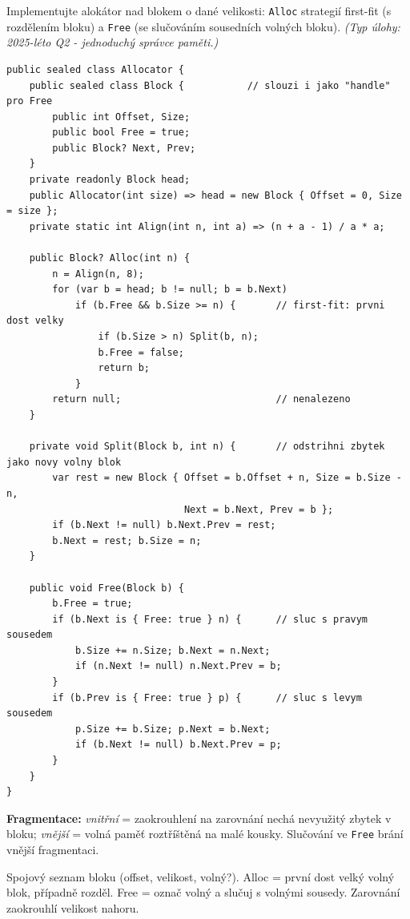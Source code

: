 \begin{zadani}
Implementujte alokátor nad blokem o dané velikosti: \texttt{Alloc} strategií first-fit (s rozdělením bloku) a \texttt{Free} (se slučováním sousedních volných bloku). \emph{(Typ úlohy: 2025-léto Q2 - jednoduchý správce paměti.)}
\end{zadani}

\begin{reseni}
\begin{lstlisting}
public sealed class Allocator {
    public sealed class Block {           // slouzi i jako "handle" pro Free
        public int Offset, Size;
        public bool Free = true;
        public Block? Next, Prev;
    }
    private readonly Block head;
    public Allocator(int size) => head = new Block { Offset = 0, Size = size };
    private static int Align(int n, int a) => (n + a - 1) / a * a;

    public Block? Alloc(int n) {
        n = Align(n, 8);
        for (var b = head; b != null; b = b.Next)
            if (b.Free && b.Size >= n) {       // first-fit: prvni dost velky
                if (b.Size > n) Split(b, n);
                b.Free = false;
                return b;
            }
        return null;                           // nenalezeno
    }

    private void Split(Block b, int n) {       // odstrihni zbytek jako novy volny blok
        var rest = new Block { Offset = b.Offset + n, Size = b.Size - n,
                               Next = b.Next, Prev = b };
        if (b.Next != null) b.Next.Prev = rest;
        b.Next = rest; b.Size = n;
    }

    public void Free(Block b) {
        b.Free = true;
        if (b.Next is { Free: true } n) {      // sluc s pravym sousedem
            b.Size += n.Size; b.Next = n.Next;
            if (n.Next != null) n.Next.Prev = b;
        }
        if (b.Prev is { Free: true } p) {      // sluc s levym sousedem
            p.Size += b.Size; p.Next = b.Next;
            if (b.Next != null) b.Next.Prev = p;
        }
    }
}
\end{lstlisting}
\textbf{Fragmentace:} \emph{vnitřní} = zaokrouhlení na zarovnání nechá nevyužitý zbytek v bloku; \emph{vnější} = volná paměť roztříštěná na malé kousky. Slučování ve \texttt{Free} brání vnější fragmentaci.
\end{reseni}

\begin{jadro}
Spojový seznam bloku (offset, velikost, volný?). Alloc = první dost velký volný blok, případně rozděl. Free = označ volný a slučuj s volnými sousedy. Zarovnání zaokrouhlí velikost nahoru.
\end{jadro}

